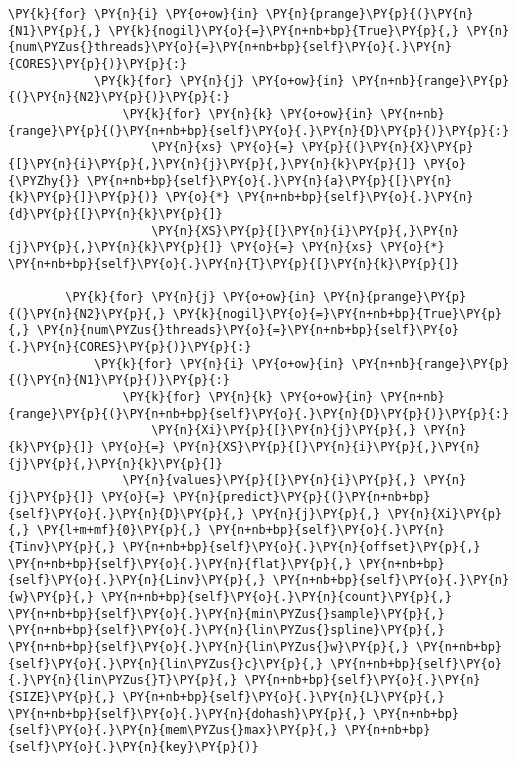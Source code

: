 \begin{Verbatim}[commandchars=\\\{\}]
        \PY{k}{for} \PY{n}{i} \PY{o+ow}{in} \PY{n}{prange}\PY{p}{(}\PY{n}{N1}\PY{p}{,} \PY{k}{nogil}\PY{o}{=}\PY{n+nb+bp}{True}\PY{p}{,} \PY{n}{num\PYZus{}threads}\PY{o}{=}\PY{n+nb+bp}{self}\PY{o}{.}\PY{n}{CORES}\PY{p}{)}\PY{p}{:}
            \PY{k}{for} \PY{n}{j} \PY{o+ow}{in} \PY{n+nb}{range}\PY{p}{(}\PY{n}{N2}\PY{p}{)}\PY{p}{:}
                \PY{k}{for} \PY{n}{k} \PY{o+ow}{in} \PY{n+nb}{range}\PY{p}{(}\PY{n+nb+bp}{self}\PY{o}{.}\PY{n}{D}\PY{p}{)}\PY{p}{:}
                    \PY{n}{xs} \PY{o}{=} \PY{p}{(}\PY{n}{X}\PY{p}{[}\PY{n}{i}\PY{p}{,}\PY{n}{j}\PY{p}{,}\PY{n}{k}\PY{p}{]} \PY{o}{\PYZhy{}} \PY{n+nb+bp}{self}\PY{o}{.}\PY{n}{a}\PY{p}{[}\PY{n}{k}\PY{p}{]}\PY{p}{)} \PY{o}{*} \PY{n+nb+bp}{self}\PY{o}{.}\PY{n}{d}\PY{p}{[}\PY{n}{k}\PY{p}{]} 
                    \PY{n}{XS}\PY{p}{[}\PY{n}{i}\PY{p}{,}\PY{n}{j}\PY{p}{,}\PY{n}{k}\PY{p}{]} \PY{o}{=} \PY{n}{xs} \PY{o}{*} \PY{n+nb+bp}{self}\PY{o}{.}\PY{n}{T}\PY{p}{[}\PY{n}{k}\PY{p}{]}

        \PY{k}{for} \PY{n}{j} \PY{o+ow}{in} \PY{n}{prange}\PY{p}{(}\PY{n}{N2}\PY{p}{,} \PY{k}{nogil}\PY{o}{=}\PY{n+nb+bp}{True}\PY{p}{,} \PY{n}{num\PYZus{}threads}\PY{o}{=}\PY{n+nb+bp}{self}\PY{o}{.}\PY{n}{CORES}\PY{p}{)}\PY{p}{:}
            \PY{k}{for} \PY{n}{i} \PY{o+ow}{in} \PY{n+nb}{range}\PY{p}{(}\PY{n}{N1}\PY{p}{)}\PY{p}{:} 
                \PY{k}{for} \PY{n}{k} \PY{o+ow}{in} \PY{n+nb}{range}\PY{p}{(}\PY{n+nb+bp}{self}\PY{o}{.}\PY{n}{D}\PY{p}{)}\PY{p}{:}
                    \PY{n}{Xi}\PY{p}{[}\PY{n}{j}\PY{p}{,} \PY{n}{k}\PY{p}{]} \PY{o}{=} \PY{n}{XS}\PY{p}{[}\PY{n}{i}\PY{p}{,}\PY{n}{j}\PY{p}{,}\PY{n}{k}\PY{p}{]}
                \PY{n}{values}\PY{p}{[}\PY{n}{i}\PY{p}{,} \PY{n}{j}\PY{p}{]} \PY{o}{=} \PY{n}{predict}\PY{p}{(}\PY{n+nb+bp}{self}\PY{o}{.}\PY{n}{D}\PY{p}{,} \PY{n}{j}\PY{p}{,} \PY{n}{Xi}\PY{p}{,} \PY{l+m+mf}{0}\PY{p}{,} \PY{n+nb+bp}{self}\PY{o}{.}\PY{n}{Tinv}\PY{p}{,} \PY{n+nb+bp}{self}\PY{o}{.}\PY{n}{offset}\PY{p}{,} \PY{n+nb+bp}{self}\PY{o}{.}\PY{n}{flat}\PY{p}{,} \PY{n+nb+bp}{self}\PY{o}{.}\PY{n}{Linv}\PY{p}{,} \PY{n+nb+bp}{self}\PY{o}{.}\PY{n}{w}\PY{p}{,} \PY{n+nb+bp}{self}\PY{o}{.}\PY{n}{count}\PY{p}{,} \PY{n+nb+bp}{self}\PY{o}{.}\PY{n}{min\PYZus{}sample}\PY{p}{,} \PY{n+nb+bp}{self}\PY{o}{.}\PY{n}{lin\PYZus{}spline}\PY{p}{,} \PY{n+nb+bp}{self}\PY{o}{.}\PY{n}{lin\PYZus{}w}\PY{p}{,} \PY{n+nb+bp}{self}\PY{o}{.}\PY{n}{lin\PYZus{}c}\PY{p}{,} \PY{n+nb+bp}{self}\PY{o}{.}\PY{n}{lin\PYZus{}T}\PY{p}{,} \PY{n+nb+bp}{self}\PY{o}{.}\PY{n}{SIZE}\PY{p}{,} \PY{n+nb+bp}{self}\PY{o}{.}\PY{n}{L}\PY{p}{,} \PY{n+nb+bp}{self}\PY{o}{.}\PY{n}{dohash}\PY{p}{,} \PY{n+nb+bp}{self}\PY{o}{.}\PY{n}{mem\PYZus{}max}\PY{p}{,} \PY{n+nb+bp}{self}\PY{o}{.}\PY{n}{key}\PY{p}{)}


\end{Verbatim}
